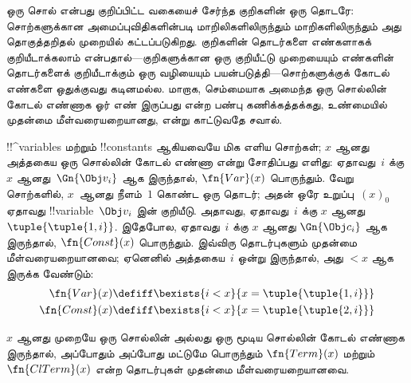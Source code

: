 \documentclass[../../../include/open-logic-section]{subfiles}
\begin{document}


\begin{explain}
ஒரு சொல் என்பது குறிப்பிட்ட வகையைச் சேர்ந்த குறிகளின் ஒரு தொடரே: சொற்களுக்கான
அமைப்புவிதிகளின்படி மாறிலிகளிலிருந்தும் மாறிகளிலிருந்தும் அது
தொகுத்தறிதல் முறையில் கட்டப்படுகிறது. குறிகளின் தொடர்களை எண்களாகக்
குறியீடாக்கலாம் என்பதால்---குறிகளுக்கான ஒரு குறியீட்டு முறையையும் எண்களின்
தொடர்களைக் குறியீடாக்கும் ஒரு வழியையும் பயன்படுத்தி---சொற்களுக்குக் கோடல்
எண்களை ஒதுக்குவது கடினமல்ல. மாறாக, செம்மையாக அமைந்த ஒரு சொல்லின் கோடல்
எண்ணாக ஓர் எண் இருப்பது என்ற பண்பு கணிக்கத்தக்கது, உண்மையில் முதன்மை
மீள்வரையறையானது, என்று காட்டுவதே சவால்.
\end{explain}

!!^{variable}s மற்றும் !!{constant}s ஆகியவையே மிக எளிய சொற்கள்; $x$ ஆனது
அத்தகைய ஒரு சொல்லின் கோடல் எண்ணா என்று சோதிப்பது எளிது: ஏதாவது~$i$ க்கு
$x$ ஆனது~$\Gn{\Obj v_i}$ ஆக இருந்தால், $\fn{Var}(x)$ பொருந்தும். வேறு
சொற்களில், $x$~ஆனது நீளம்~$1$ கொண்ட ஒரு தொடர்; அதன் ஒரே உறுப்பு~$(x)_0$
ஏதாவது !!{variable}~$\Obj v_i$ இன் குறியீடு. அதாவது, ஏதாவது~$i$ க்கு
$x$ ஆனது~$\tuple{\tuple{1, i}}$. இதேபோல, ஏதாவது~$i$ க்கு $x$ ஆனது
$\Gn{\Obj c_i}$ ஆக இருந்தால், $\fn{Const}(x)$ பொருந்தும். இவ்விரு
தொடர்புகளும் முதன்மை மீள்வரையறையானவை; ஏனெனில் அத்தகைய~$i$ ஒன்று இருந்தால்,
அது $< x$ ஆக இருக்க வேண்டும்:
\begin{align*}
  \fn{Var}(x) & \defiff \bexists{i<x}{x = \tuple{\tuple{1, i}}}\\
  \fn{Const}(x) & \defiff \bexists{i<x}{x = \tuple{\tuple{2, i}}}
\end{align*}

\begin{prop}
$x$ ஆனது முறையே ஒரு சொல்லின் அல்லது ஒரு மூடிய சொல்லின் கோடல் எண்ணாக
இருந்தால், அப்போதும் அப்போது மட்டுமே பொருந்தும் $\fn{Term}(x)$ மற்றும்
$\fn{ClTerm}(x)$ என்ற தொடர்புகள் முதன்மை மீள்வரையறையானவை.
\end{prop}
\end{document}
